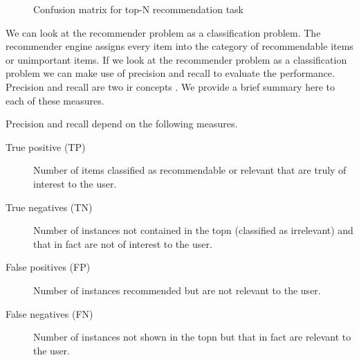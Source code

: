 \begin{figure}
\centering
{}
\caption{Confusion matrix for top-N recommendation task}
\label{fig:confusionmatrix}
\end{figure}

We can look at the recommender problem as a classification problem. The recommender engine assigns every item into the category of recommendable items or unimportant items.
If we look at the recommender problem as a classification problem we can make use of precision and recall to evaluate the performance. Precision and \gls{recall} are two \gls{ir} concepts \cite{Manning}. We provide a brief summary here to each of these measures.

Precision and recall depend on the following measures.
\begin{description}
\item[True positive (TP)] Number of items classified as recommendable or relevant that are truly of interest to the user. 
\item[True negatives (TN)] Number of instances not contained in the \gls{topn} (classified as irrelevant) and that in fact are not of interest to the user.
\item[False positives (FP)] Number of instances recommended but are not relevant to the user.
\item[False negatives (FN)] Number of instances not shown in the \gls{topn} but that in fact are relevant to the user.
\end{description}


